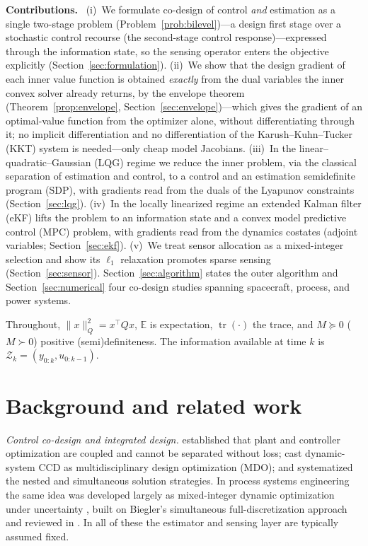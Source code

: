 \documentclass[twocolumn,amsthm]{autart}
\begin{document}
\noindent\textbf{Contributions.}~
(i)~We formulate co-design of control \emph{and} estimation as a single two-stage
problem (Problem~\ref{prob:bilevel})---a design first stage over a stochastic
control recourse (the second-stage control response)---expressed through the
information state, so
the sensing operator enters the objective explicitly
(Section~\ref{sec:formulation}). (ii)~We show that the design gradient of each
inner value function is obtained \emph{exactly} from the dual variables the inner
convex solver already returns, by the envelope theorem
(Theorem~\ref{prop:envelope}, Section~\ref{sec:envelope})---which gives the
gradient of an optimal-value function from the optimizer alone, without
differentiating through it; no implicit
differentiation and no differentiation of the Karush--Kuhn--Tucker (KKT) system
is needed---only cheap model Jacobians. (iii)~In the linear--quadratic--Gaussian
(LQG) regime we reduce the inner problem, via the classical separation of
estimation and control, to a control and an
estimation semidefinite program (SDP), with gradients read from the duals of the
Lyapunov constraints (Section~\ref{sec:lqg}). (iv)~In the locally linearized
regime an extended Kalman filter (eKF) lifts the problem to an information state
and a convex model predictive control (MPC) problem, with gradients read from the
dynamics costates (adjoint variables; Section~\ref{sec:ekf}). (v)~We treat sensor allocation as a
mixed-integer selection and show its $\ell_1$ relaxation promotes sparse sensing
(Section~\ref{sec:sensor}). Section~\ref{sec:algorithm} states the outer
algorithm and Section~\ref{sec:numerical} four co-design studies spanning
spacecraft, process, and power systems.

Throughout, $\| x \|_Q^2 = x^\top Q x$, $\mathbb{E}$ is expectation,
$\operatorname{tr}(\cdot)$ the trace, and $M \succeq 0$ ($M \succ 0$) positive
(semi)definiteness. The information available at time $k$ is
$\mathcal{Z}_k = (y_{0:k}, u_{0:k-1})$.

\section{Background and related work}\label{sec:related}

\emph{Control co-design and integrated design.}
\cite{fathy2001coupling} established that plant and controller optimization are
coupled and cannot be separated without loss; \cite{allison2014multidisciplinary}
cast dynamic-system CCD as multidisciplinary design optimization (MDO); and
\cite{herber2019nested} systematized the nested and simultaneous solution
strategies. In process systems
engineering the same idea was developed largely as mixed-integer dynamic
optimization under uncertainty \cite{diangelakis2017process},
built on Biegler's simultaneous full-discretization approach
\cite{biegler2010nonlinear} and reviewed in
\cite{sakizlis2004recent,sharifzadeh2013integration}. In all of
these the estimator and sensing layer are typically assumed fixed.
\end{document}
